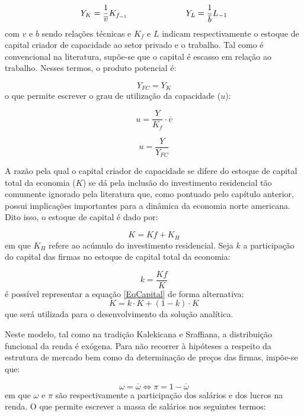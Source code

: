 $$
Y_K = \frac{1}{\overline v}K_{f_{-1}} \hspace{2.5cm} Y_L = \frac{1}{\overline b}L_{-1}
$$
com $v$ e $b$ sendo relações técnicas e $K_f$ e $L$ indicam respectivamente o estoque de capital criador de capacidade ao setor privado e  o trabalho. Tal como é convencional na literatura, supõe-se que o capital é escasso em relação ao trabalho. Nesses termos, o produto potencial é:

\begin{equation}
\label{_YFC}
    Y_{FC} = Y_K
\end{equation}
o que permite escrever o grau de utilização da capacidade ($u$):

$$
u = \frac{Y}{K_f}\cdot \overline v
$$

\begin{equation}
\label{_u}
    u = \frac{Y}{Y_{FC}}
\end{equation}

A razão pela qual o capital criador de capacidade se difere do estoque de capital total da economia ($K$) se dá pela inclusão do investimento residencial tão comumente ignorado pela literatura que, como pontuado pelo capítulo anterior, possui implicações importantes para a dinâmica da economia norte americana. Dito isso, o estoque de capital é dado por:

\begin{equation}
\label{_K}
    K = Kf + K_{H}
\end{equation}
em que $K_H$ refere ao acúmulo do investimento residencial. Seja $k$ a participação do capital das firmas no estoque de capital total da economia:

\begin{equation}
\label{_tau}
k = \frac{Kf}{K}    
\end{equation}
é possível representar a equação \ref{EqCapital} de forma alternativa:
$$
K = k\cdot K + (1-k)\cdot K
$$
que será utilizada para o desenvolvimento da solução analítica.

Neste modelo, tal como na tradição Kalekicana e Sraffiana, a distribuição funcional da renda é exógena. Para não recorrer à hipóteses a respeito da estrutura de mercado bem como da determinação de preços das firmas, impõe-se que:

\begin{equation}
    \omega = \overline{\omega} \Leftrightarrow \pi = 1 - \overline{\omega}
\end{equation}
em que $\omega$ e $\pi$ são respectivamente a participação dos salários e dos lucros na renda. O que permite escrever a massa de salários nos seguintes termos:


